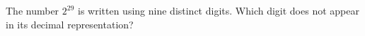 The number $2^{29}$ is written using nine distinct digits. Which digit does not appear in its decimal representation?
